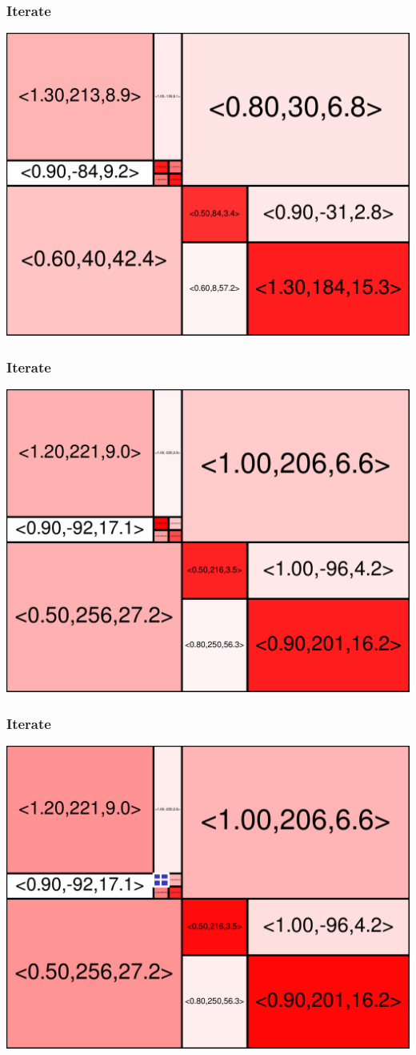 \begin{frame}
\frametitle{Iterate}\begin{centering}\includegraphics[width=8.5 cm]{remy-graph/graph/test12.pdf}

\end{centering}\end{frame}


\begin{frame}
\frametitle{Iterate}\begin{centering}\includegraphics[width=8.5 cm]{remy-graph/graph/test13.pdf}

\end{centering}\end{frame}


\begin{frame}
\frametitle{Iterate}\begin{centering}\includegraphics[width=8.5 cm]{remy-graph/graph/test14.pdf}

\end{centering}\end{frame}


